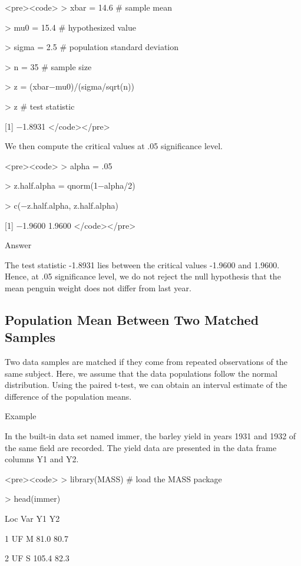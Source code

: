 \begin{framed}
<pre><code>
> xbar = 14.6            # sample mean 

> mu0 = 15.4             # hypothesized value 

> sigma = 2.5            # population standard deviation 

> n = 35                 # sample size 

> z = (xbar−mu0)/(sigma/sqrt(n)) 

> z                      # test statistic 

[1] −1.8931
</code></pre>

We then compute the critical values at .05 significance level.

\begin{framed}
<pre><code>
> alpha = .05 

> z.half.alpha = qnorm(1−alpha/2) 

> c(−z.half.alpha, z.half.alpha) 

[1] −1.9600  1.9600
</code></pre>

Answer

The test statistic -1.8931 lies between the critical values -1.9600 and 1.9600. Hence, at .05 significance level, we do not reject the null hypothesis that the mean penguin weight does not differ from last year.

\subsection{Population Mean Between Two Matched Samples}

Two data samples are matched if they come from repeated observations of the same subject. Here, we assume that the data populations follow the normal distribution. Using the paired t-test, we can obtain an interval estimate of the difference of the population means.


Example

In the built-in data set named immer, the barley yield in years 1931 and 1932 of the same field are recorded. The yield data are presented in the data frame columns Y1 and Y2.

\begin{framed}
<pre><code>
> library(MASS)         # load the MASS package 

> head(immer) 

 Loc Var    Y1    Y2 

1  UF   M  81.0  80.7 

2  UF   S 105.4  82.3 


\end{framed}
\end{framed}
\end{framed}
